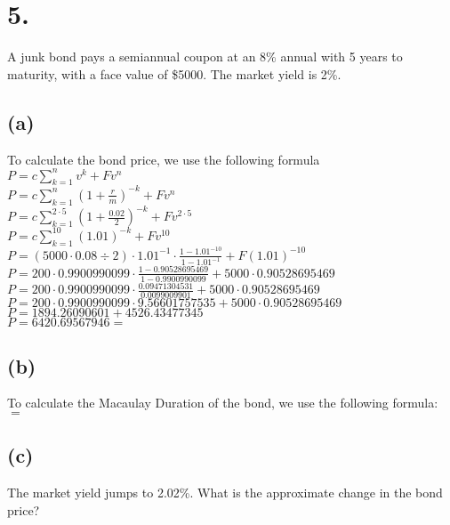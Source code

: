 \documentclass{article}
\begin{document}
\section*{5.}
{\Large 

A junk bond pays a semiannual coupon at an 8\% annual with 5 years to maturity, with a face value of \$5000. The market yield is 2\%.

\subsection*{(a)}

To calculate the bond price, we use the following formula \\
$P = c \sum_{k=1}^{n} v^k + Fv^n$ \\
$P = c \sum_{k=1}^{n} (1 + \frac{r}{m})^{-k} + Fv^n$ \\
$P = c \sum_{k=1}^{2 \cdot 5} (1 + \frac{0.02}{2})^{-k} + Fv^{2 \cdot 5}$ \\
$P = c \sum_{k=1}^{10} (1.01)^{-k} + Fv^{10}$ \\ 
$P = (5000 \cdot 0.08 \div 2) \cdot 1.01^{-1} \cdot \frac{1 - 1.01^{-10}}{1 - 1.01^{-1}} + F(1.01)^{-10}$ \\
$P = 200 \cdot 0.9900990099 \cdot \frac{1 - 0.90528695469}{1 - 0.9900990099} + 5000 \cdot 0.90528695469$ \\
$P = 200 \cdot 0.9900990099 \cdot \frac{0.09471304531}{0.0099009901} + 5000 \cdot 0.90528695469$ \\
$P = 200 \cdot 0.9900990099 \cdot 9.56601757535 + 5000 \cdot 0.90528695469$
$P = 1894.26090601 + 4526.43477345$ \\
$P = 6420.69567946 = $ 

\subsection*{(b)}

To calculate the Macaulay Duration of the bond, we use the following formula: \\
$= $ 

\subsection*{(c)}

The market yield jumps to 2.02\%. What is the approximate change in the bond price? \\

}
\end{document}
